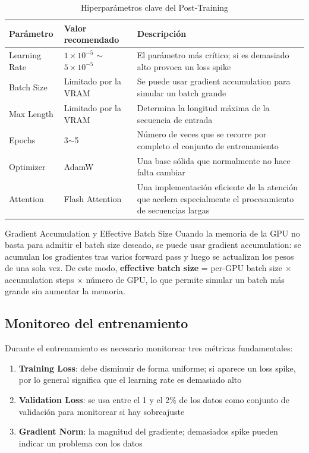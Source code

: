 \begin{table}[H]
\centering
\caption{Hiperparámetros clave del Post-Training}
\begin{tabular}{lll}
\toprule
\textbf{Parámetro} & \textbf{Valor recomendado} & \textbf{Descripción} \\
\midrule
Learning Rate & $1 \times 10^{-5}$ $\sim$ $5 \times 10^{-5}$ & El parámetro más crítico; si es demasiado alto provoca un loss spike \\
Batch Size & Limitado por la VRAM & Se puede usar gradient accumulation para simular un batch grande \\
Max Length & Limitado por la VRAM & Determina la longitud máxima de la secuencia de entrada \\
Epochs & 3$\sim$5 & Número de veces que se recorre por completo el conjunto de entrenamiento \\
Optimizer & AdamW & Una base sólida que normalmente no hace falta cambiar \\
Attention & Flash Attention & Una implementación eficiente de la atención que acelera especialmente el procesamiento de secuencias largas \\
\bottomrule
\end{tabular}
\end{table}

\begin{knowledgebox}{Gradient Accumulation y Effective Batch Size}
Cuando la memoria de la GPU no basta para admitir el batch size deseado, se puede usar gradient accumulation: se acumulan los gradientes tras varios forward pass y luego se actualizan los pesos de una sola vez. De este modo, \textbf{effective batch size} = per-GPU batch size $\times$ accumulation steps $\times$ número de GPU, lo que permite simular un batch más grande sin aumentar la memoria.
\end{knowledgebox}

\subsection{Monitoreo del entrenamiento}

Durante el entrenamiento es necesario monitorear tres métricas fundamentales:

\begin{enumerate}
    \item \textbf{Training Loss}: debe disminuir de forma uniforme; si aparece un loss spike, por lo general significa que el learning rate es demasiado alto
    \item \textbf{Validation Loss}: se usa entre el 1 y el 2\% de los datos como conjunto de validación para monitorear si hay sobreajuste
    \item \textbf{Gradient Norm}: la magnitud del gradiente; demasiados spike pueden indicar un problema con los datos
\end{enumerate}


